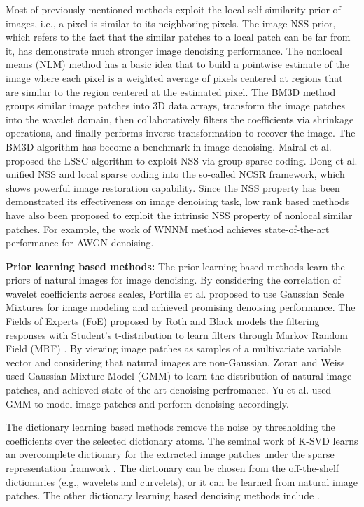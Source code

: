 Most of previously mentioned methods exploit the local self-similarity prior of images, i.e., a pixel is similar to its neighboring pixels. The image NSS prior, which refers to the fact that the similar patches to a local patch can be far from it, has demonstrate much stronger image denoising performance. The nonlocal means (NLM) method \cite{nlm} has a basic idea that to build a pointwise estimate of the image where each pixel is a weighted average of pixels centered at regions that are similar to the region centered at the estimated pixel. The BM3D \cite{bm3d} method groups similar image patches into 3D data arrays, transform the image patches into the wavalet domain, then collaboratively filters the coefficients via shrinkage operations, and finally performs inverse transformation to recover the image. The BM3D algorithm has become a benchmark in image denoising. Mairal et al. \cite{lssc} proposed the LSSC algorithm to exploit NSS via group sparse coding. Dong et al. \cite{ncsr} unified NSS and local sparse coding into the so-called NCSR framework, which shows powerful image restoration capability. Since the NSS property has been demonstrated its effectiveness on image denoising task, low rank based methods \cite{nnm,wnnm} have also been proposed to exploit the intrinsic NSS property of nonlocal similar patches. For example, the work of WNNM \cite{wnnm} method achieves state-of-the-art performance for AWGN denoising. 

\textbf{Prior learning based methods:} The prior learning based methods learn the priors of natural images for image denoising. By considering the correlation of wavelet coefficients across scales, Portilla et al. \cite{blsgsm} proposed to use Gaussian Scale Mixtures for image modeling and achieved promising denoising performance. The Fields of Experts (FoE) \cite{foe} proposed by Roth and Black models the filtering responses with Student's t-distribution to learn filters through Markov Random Field (MRF) \cite{Bishop}. By viewing image patches as samples of a multivariate variable vector and considering that natural images are non-Gaussian, Zoran and Weiss \cite{epll,gmmnips} used Gaussian Mixture Model (GMM) to learn the distribution of natural image patches, and achieved state-of-the-art denoising perfromance. Yu et al. \cite{ple} used GMM to model image patches and perform denoising accordingly. 

The dictionary learning based methods remove the noise by thresholding the coefficients over the selected dictionary atoms. The seminal work of K-SVD \cite{ksvd} learns an overcomplete dictionary for the extracted image patches under the sparse representation framwork \cite{olshausen1997sparse,olshausen1996emergence}. The dictionary can be chosen from the off-the-shelf dictionaries (e.g., wavelets and curvelets), or it can be learned from natural image patches. The other dictionary learning based denoising methods include  \cite{ksvdtsp,srcolor,onlinedl}.


